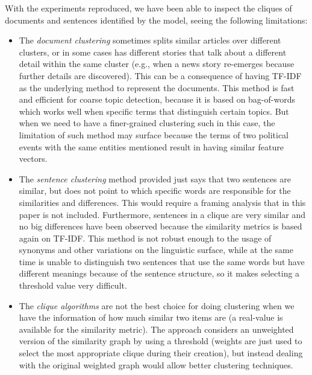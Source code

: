With the experiments reproduced, we have been able to inspect the cliques of documents and sentences identified by the model, seeing the following limitations:

\begin{itemize}
    \item The \emph{document clustering} sometimes splits similar articles over different clusters, or in some cases has different stories that talk about a different detail within the same cluster (e.g., when a news story re-emerges because further details are discovered).
    This can be a consequence of having TF-IDF as the underlying method to represent the documents.
    This method is fast and efficient for coarse topic detection, because it is based on bag-of-words which works well when specific terms that distinguish certain topics.
    But when we need to have a finer-grained clustering such in this case, the limitation of such method may surface because the terms of two political events with the same entities mentioned result in having similar feature vectors.
    \item The \emph{sentence clustering} method provided just says that two sentences are similar, but does not point to which specific words are responsible for the similarities and differences. This would require a framing analysis that in this paper is not included. Furthermore, sentences in a clique are very similar and no big differences have been observed because the similarity metrics is based again on TF-IDF. This method is not robust enough to the usage of synonyms and other variations on the linguistic surface, while at the same time is unable to distinguish two sentences that use the same words but have different meanings because of the sentence structure, so it makes selecting a threshold value very difficult.
    \item The \emph{clique algorithms} are not the best choice for doing clustering when we have the information of how much similar two items are (a real-value is available for the similarity metric). The approach considers an unweighted version of the similarity graph by using a threshold (weights are just used to select the most appropriate clique during their creation), but instead dealing with the original weighted graph would allow better clustering techniques. %
\end{itemize}


